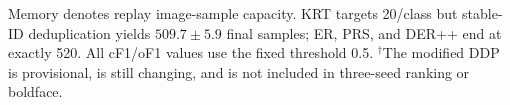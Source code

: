 \begin{table}[t]
  \vspace{2pt}
  \begin{minipage}{\textwidth}
    \footnotesize
    Memory denotes replay image-sample capacity. KRT targets 20/class but
    stable-ID deduplication yields $509.7{\pm}5.9$ final samples; ER, PRS, and
    DER++ end at exactly 520. All cF1/oF1 values use the fixed threshold 0.5.
    $^{\dagger}$The modified DDP is provisional, is still changing, and is not
    included in three-seed ranking or boldface.
  \end{minipage}
\end{table}
